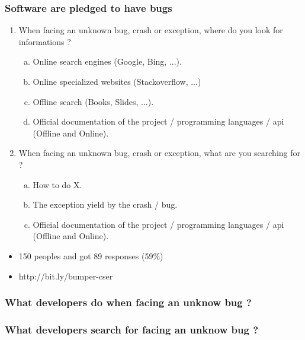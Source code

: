 \documentclass{beamer}
\begin{document}
\begin{frame}
\frametitle{Software are pledged to have bugs}


\vspace{0.3cm}
\begin{enumerate}
  \item When facing an unknown bug, crash or exception, where do you look for informations ?
  \begin{enumerate}[a)]
    \item Online search engines (Google, Bing, ...).
    \item Online specialized websites (Stackoverflow, ...)
    \item Offline search (Books, Slides, ...).
    \item Official documentation of the project / programming languages / api (Offline and Online).
  \end{enumerate}
  \item When facing an unknown bug, crash or exception, what are you searching for ?
  \begin{enumerate}[a)]
    \item How to do X.
    \item The exception yield by the crash / bug.
    \item Official documentation of the project / programming languages / api (Offline and Online).
  \end{enumerate}

\end{enumerate}
\begin{itemize}
\item 150 peoples and got 89 responses (59\%)
\item http://bit.ly/bumper-cser
\end{itemize}
\end{frame}

\begin{frame}
\frametitle{What developers do when facing an unknow bug ?}





\end{frame}

\begin{frame}
\frametitle{What developers search for facing an unknow bug ?}





\end{frame}
\end{document}

